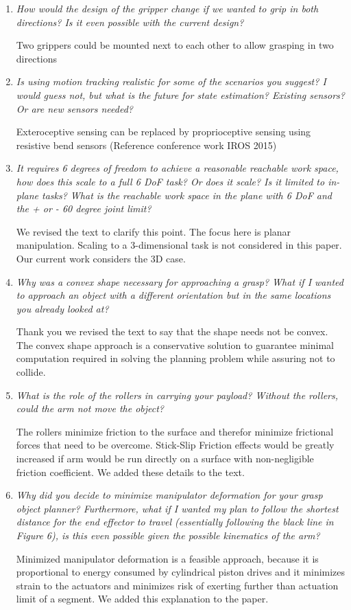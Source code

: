 \documentclass[letterpaper, 10 pt, twocolumn, conference]{article}
\begin{document}
\begin{enumerate}
\item \textit{How would the design of the gripper change if we wanted to grip in both directions? Is it even possible with the current design?}

Two grippers could be mounted next to each other to allow grasping in two directions

\item \textit{Is using motion tracking realistic for some of the scenarios you suggest? I would guess not, but what is the future for state estimation? Existing sensors? Or are new sensors needed?}

Exteroceptive sensing can be replaced by proprioceptive sensing using resistive bend sensors (Reference conference work IROS 2015)

\item \textit{It requires 6 degrees of freedom to achieve a reasonable reachable work space, how does this scale to a full 6 DoF task? Or does it scale? Is it limited to in-plane tasks? What is the reachable work space in the plane with 6 DoF and the + or - 60 degree joint limit?}

We revised the text to clarify this point. The focus here is planar manipulation. Scaling to a 3-dimensional task is not considered in this paper. Our current work considers the 3D case. 

\item \textit{Why was a convex shape necessary for approaching a grasp? What if I wanted to approach an object with a different orientation but in the same locations you already looked at?}

Thank you we revised the text to say that the shape needs not be convex. The convex shape approach is a conservative solution to guarantee minimal computation required in solving the planning problem while assuring not to collide. 

\item \textit{What is the role of the rollers in carrying your payload? Without the rollers, could the arm not move the object?}

The rollers minimize friction to the surface and therefor minimize frictional forces that need to be overcome. Stick-Slip Friction effects would be greatly increased if arm would be run directly on a surface with non-negligible friction coefficient. We added these details to the text.

\item \textit{Why did you decide to minimize manipulator deformation for your grasp object planner? Furthermore, what if I wanted my plan to follow the shortest distance for the end effector to travel (essentially following the black line in Figure 6), is this even possible given the possible kinematics of the arm?}

Minimized manipulator deformation is a feasible approach, because it is proportional to energy consumed by cylindrical piston drives and it minimizes strain to the actuators and minimizes risk of exerting further than actuation limit of a segment. We added this explanation to the paper. 

\end{enumerate}
%
\end{document}

